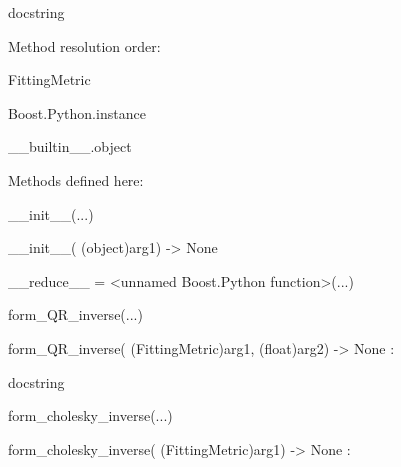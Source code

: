 \documentclass[letterpaper,10pt,english]{sphinxmanual}
\begin{document}
\begin{description}
\begin{description}
\item[{class FittingMetric(Boost.Python.instance)}] \leavevmode
\begin{DUlineblock}{0em}
\item[] docstring
\item[] 
\item[] Method resolution order:
\item[]
\begin{DUlineblock}{\DUlineblockindent}
\item[] FittingMetric
\item[] Boost.Python.instance
\item[] \_\_builtin\_\_.object
\item[] 
\end{DUlineblock}
\item[] Methods defined here:
\item[] 
\item[] \_\_init\_\_(...)
\item[]
\begin{DUlineblock}{\DUlineblockindent}
\item[] \_\_init\_\_( (object)arg1) -\textgreater{} None
\item[] 
\end{DUlineblock}
\item[] \_\_reduce\_\_ = \textless{}unnamed Boost.Python function\textgreater{}(...)
\item[] 
\item[] form\_QR\_inverse(...)
\item[]
\begin{DUlineblock}{\DUlineblockindent}
\item[] form\_QR\_inverse( (FittingMetric)arg1, (float)arg2) -\textgreater{} None :
\item[]
\begin{DUlineblock}{\DUlineblockindent}
\item[] docstring
\item[] 
\end{DUlineblock}
\end{DUlineblock}
\item[] form\_cholesky\_inverse(...)
\item[]
\begin{DUlineblock}{\DUlineblockindent}
\item[] form\_cholesky\_inverse( (FittingMetric)arg1) -\textgreater{} None :
\item[]
\begin{DUlineblock}{\DUlineblockindent}

\end{DUlineblock}
\end{DUlineblock}
\end{DUlineblock}
\end{description}
\end{description}
\end{document}

